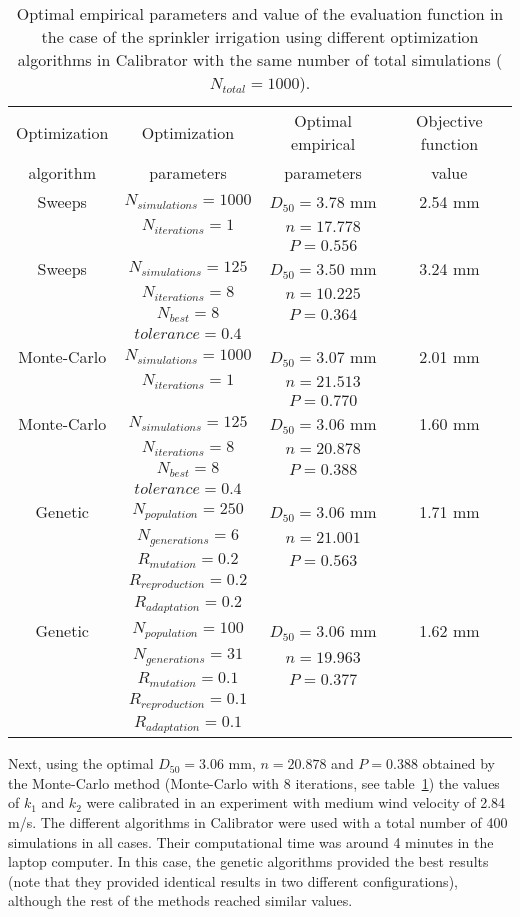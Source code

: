 \documentclass[review,authoryear]{elsarticle}
\newcommand{\TABLE}[5]
{
	\begin{table}[ht!]
		\centering
		\caption{#4.\label{#5}}
		#1
		\begin{tabular}{#2}
			#3
		\end{tabular}
	\end{table}
}
\begin{document}
\TABLE{\scriptsize}{cccc}
{
	Optimization & Optimization & Optimal empirical & Objective function
	\\ algorithm & parameters & parameters & value
	\\ \hline
	Sweeps & $N_{simulations}=1000$ & $D_{50}=3.78$ mm & 2.54 mm
	\\ & $N_{iterations}=1$ & $n=17.778$
	\\ & & $P=0.556$
	\\ \hline
	Sweeps & $N_{simulations}=125$ & $D_{50}=3.50$ mm & 3.24 mm
	\\ & $N_{iterations}=8$ & $n=10.225$
	\\ & $N_{best}=8$ & $P=0.364$
	\\ & $tolerance=0.4$
	\\ \hline
	Monte-Carlo & $N_{simulations}=1000$ & $D_{50}=3.07$ mm & 2.01 mm
	\\ & $N_{iterations}=1$ & $n=21.513$
	\\ & & $P=0.770$
	\\ \hline
	Monte-Carlo & $N_{simulations}=125$ & $D_{50}=3.06$ mm & 1.60 mm
	\\ & $N_{iterations}=8$ & $n=20.878$
	\\ & $N_{best}=8$ & $P=0.388$
	\\ & $tolerance=0.4$
	\\ \hline
	Genetic & $N_{population}=250$ & $D_{50}=3.06$ mm & 1.71 mm
	\\ & $N_{generations}=6$ & $n=21.001$
	\\ & $R_{mutation}=0.2$ & $P=0.563$
	\\ & $R_{reproduction}=0.2$
	\\ & $R_{adaptation}=0.2$
	\\ \hline
	Genetic & $N_{population}=100$ & $D_{50}=3.06$ mm & 1.62 mm
	\\ & $N_{generations}=31$ & $n=19.963$
	\\ & $R_{mutation}=0.1$ & $P=0.377$
	\\ & $R_{reproduction}=0.1$
	\\ & $R_{adaptation}=0.1$
	\\ \hline
}{Optimal empirical parameters and value of the evaluation function in the case of the sprinkler irrigation
using different optimization algorithms in Calibrator with the same number of total simulations ($N_{total}=1000$)}{TabSprinklerI}

Next, using the optimal $D_{50}=3.06$ mm, $n=20.878$ and $P=0.388$ obtained by the Monte-Carlo method (Monte-Carlo with 8 iterations, see table~\ref{TabSprinklerI}) the values of $k_1$ and $k_2$ were calibrated in an experiment with medium wind velocity of 2.84 m/s. The different algorithms in Calibrator were used with a total number of 400 simulations in all cases. Their computational time was around 4 minutes in the laptop computer. In this case, the genetic algorithms provided the best results  (note that they provided identical results in two different configurations), although the rest of the methods reached similar values.
\end{document}
